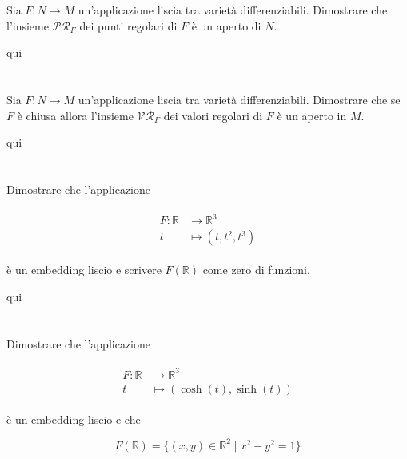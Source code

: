 \begin{tcolorbox}
	Sia $ F : N \to M $ un'applicazione liscia tra varietà differenziabili. Dimostrare che l'insieme $ \mathcal{PR}_{F} $ dei punti regolari di $ F $ è un aperto di $ N $.
\end{tcolorbox}

qui

\section{}\label{es2-18}

\begin{tcolorbox}
		Sia $ F : N \to M $ un'applicazione liscia tra varietà differenziabili. Dimostrare che se $ F $ è chiusa allora  l'insieme $ \mathcal{VR}_{F} $ dei valori regolari di $ F $ è un aperto in $ M $.
\end{tcolorbox}

qui

\section{}\label{es2-19}

\begin{tcolorbox}
	Dimostrare che l'applicazione
	
	\begin{align}
		\begin{split}
			F : \mathbb{R} &\to \mathbb{R}^{3}\\
			t &\mapsto (t,t^{2},t^{3})
		\end{split}
	\end{align}

	è un embedding liscio e scrivere $ F(\mathbb{R}) $ come zero di funzioni.
\end{tcolorbox}

qui

\section{}\label{es2-20}

\begin{tcolorbox}
	Dimostrare che l'applicazione
	
	\begin{align}
		\begin{split}
			F : \mathbb{R} &\to \mathbb{R}^{3}\\
			t &\mapsto (\cosh(t),\sinh(t))
		\end{split}
	\end{align}
	
	è un embedding liscio e che
	
	\begin{equation}
		F(\mathbb{R}) = \{ (x,y) \in \mathbb{R}^{2} \mid x^{2}-y^{2} = 1 \}
	\end{equation}
\end{tcolorbox}

